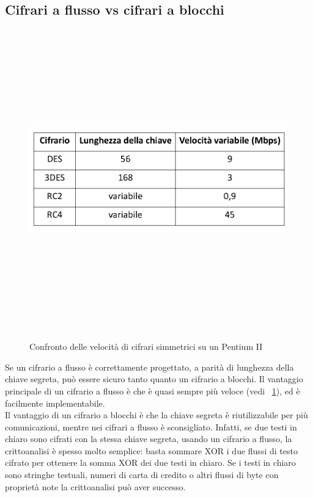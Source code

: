 \subsection{Cifrari a flusso vs cifrari a blocchi}
\begin{figure}[htbp]
	\centering%
	\subfigure%
	{\includegraphics[height=13cm, width=13cm, keepaspectratio]{Immagini/chiave_segreta/flusso_vel.png}}
	\caption{Confronto delle velocità di cifrari simmetrici su un Pentium II \label{fig:flusso_vel}} 	
\end{figure}
Se un cifrario a flusso è correttamente progettato, a parità di lunghezza della chiave segreta, può essere sicuro tanto quanto un cifrario a blocchi. Il vantaggio principale di un cifrario a flusso è che è quasi sempre più veloce (vedi \figurename ~\ref{fig:flusso_vel}), ed è facilmente implementabile.\\

Il vantaggio di un cifrario a blocchi è che la chiave segreta è riutilizzabile per più comunicazioni, mentre nei cifrari a flusso è sconsigliato. Infatti, se due testi in chiaro sono cifrati con la stessa chiave segreta, usando un cifrario a flusso, la crittoanalisi è spesso molto semplice: basta sommare XOR i due flussi di testo cifrato per ottenere la somma XOR dei due testi in chiaro. Se i testi in chiaro sono stringhe testuali, numeri di carta di credito o altri flussi di byte con proprietà note la crittoanalisi può aver successo.

